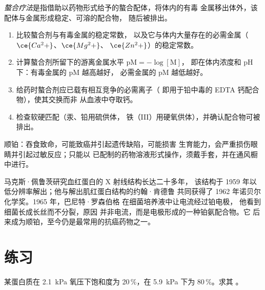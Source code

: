 \begin{definition}[螯合疗法]\label{def:b3:bioinorganic:chelation-therapy}
\emph{螯合疗法}是指借助以药物形式给予的螯合配体，将体内的有毒
金属移出体外，该配体与金属形成稳定、可溶的配合物，
随后被排出。
\end{definition}

\begin{method}[选择螯合药物]\label{met:b3:bioinorganic:choose-chelator}
\begin{enumerate}
  \item 比较螯合剂与有毒金属的稳定常数，
        以及它与体内大量存在的必需金属（$\ce{Ca^2+}$、$\ce{Mg^2+}$、
        $\ce{Zn^2+}$）的稳定常数。
  \item 计算螯合剂所留下的游离金属水平 $\mathrm{pM} = -\log[\mathrm M]$，
        即在体内浓度和 pH 下：有毒金属的 pM 越高越好，
        必需金属的 pM 越低越好。
  \item 给药时螯合剂应已载有相互竞争的必需离子（
        即用于铅中毒的 EDTA 钙配合物），使其交换而非
        从血液中夺取钙。
  \item 检查软硬匹配（汞、铅用硫供体，
        铁（III）用硬氧供体），并确认配合物可被排出。
\end{enumerate}
\end{method}

\begin{safety}{}
顺铂：吞食致命，可能致癌并引起遗传缺陷，可能损害
生育能力，会严重损伤眼睛并引起过敏反应；只能以
已配制的药物溶液形式操作，须戴手套，并在通风橱中进行。
\end{safety}

\begin{history}[一种蛋白质结构与一种偶然发现的药物]
马克斯·佩鲁茨研究血红蛋白的 X 射线结构长达二十多年，
该结构于 1959 年以低分辨率解出；他与解出肌红蛋白结构的约翰·肯德鲁
共同获得了 1962 年诺贝尔化学奖。1965 年，巴尼特·罗森伯格
在细菌培养液中让电流经过铂电极，
他看到细菌长成长丝而不分裂，原因
并非电流，而是电极形成的一种铂氨配合物。它
后来成为顺铂，至今仍是最常用的抗癌药物之一。
\end{history}

\section{练习}

\begin{exercise}[$\star$]\label{exo:b3:bioinorganic:1}
某蛋白质在 \qty{2.1}{kPa} 氧压下饱和度为 20\,\%，在 \qty{5.9}{kPa} 下为 80\,\%。求其
。
\end{exercise}

